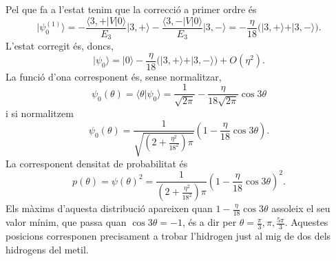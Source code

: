\documentclass[12pt]{article}
\numberwithin{table}{section}
\numberwithin{figure}{section}
\newcommand{\ket}[1]{\vert {#1} \rangle}
\newcommand{\bra}[1]{\langle #1 \vert}
\newcommand{\braket}[2]{\langle {#1} \vert {#2} \rangle}
\begin{document}
Pel que fa a l'estat tenim que la correcció a primer ordre és
\begin{equation*}
	\ket{\psi_0^{(1)}} = -\frac{\bra{3,+}V\ket{0}}{E_3}\ket{3,+} -\frac{\bra{3,-}V\ket{0}}{E_3}\ket{3,-} = -\frac{\eta}{18}\big( \ket{3,+} + \ket{3,-} \big).
\end{equation*}
L'estat corregit és, doncs,
\begin{equation*}
	\ket{\psi_0} = \ket{0} -\frac{\eta}{18}\big( \ket{3,+} + \ket{3,-} \big) + O(\eta^2).
\end{equation*}
La funció d'ona corresponent és, sense normalitzar,
\begin{equation*}
	\psi_0(\theta) = \braket{\theta}{\psi_0} = \frac{1}{\sqrt{2\pi}} - \frac{\eta}{18\sqrt{2\pi}}\cos{3\theta}
\end{equation*}
i si normalitzem
\begin{equation*}
	\psi_0(\theta) = \frac{1}{\sqrt{\left(2 + \frac{\eta^2}{18^2}\right)\pi}}\left(1 - \frac{\eta}{18}\cos{3\theta}\right).
\end{equation*}
La corresponent densitat de probabilitat és
\begin{equation*}
	p(\theta) = \psi(\theta)^2 = \frac{1}{\left(2 + \frac{\eta^2}{18^2}\right)\pi}\left(1 - \frac{\eta}{18}\cos{3\theta}\right)^2.
\end{equation*}
Els màxims d'aquesta distribució apareixen quan \( 1 - \frac{\eta}{18}\cos{3\theta} \) assoleix el seu valor mínim, que passa quan \( \cos{3\theta} = -1 \), és a dir per \( \theta = \frac{\pi}{3}, \pi, \frac{5\pi}{3} \). Aquestes posicions corresponen precisament a trobar l'hidrogen just al mig de dos dels hidrogens del metil.
\end{document}
